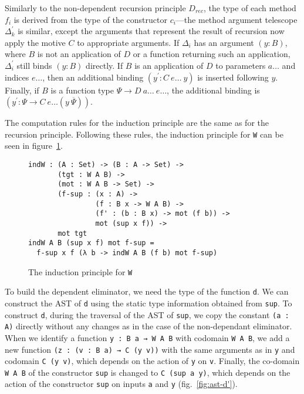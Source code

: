 \documentclass[sigplan,10pt]{acmart}
\begin{document}
Similarly to the non-dependent recursion principle $D_{\mathit{rec}}$, the type of each method $f_i$ is derived from the type of the constructor $c_i$---the method argument telescope $\Delta_k^\prime$ is similar, except the arguments that represent the result of recursion now apply the motive $C$ to appropriate arguments.
If $\Delta_i$ has an argument $(y : B)$, where $B$ is not an application of $D$ or a function returning such an application, $\Delta_i^\prime$ still binds $(y : B)$ directly.
If $B$ is an application of $D$ to parameters $a\ldots$ and indices $e\ldots$, then an additional binding $(y^\prime : C\ e\ldots\ y)$ is inserted following $y$.
Finally, if $B$ is a function type $\Psi \to D\ a\ldots\ e\ldots$, the additional binding is $(y^\prime : \Psi \to C\ e\ldots (y\ \overline{\Psi}))$. 

The computation rules for the induction principle are the same as for the recursion principle.
Following these rules, the induction principle for \texttt{W} can be seen in figure~\ref{fig:w-ind}.

\begin{figure}
\begin{Verbatim}
indW : (A : Set) -> (B : A -> Set) ->
       (tgt : W A B) ->
       (mot : W A B -> Set) ->
       (f-sup : (x : A) ->
                (f : B x -> W A B) ->
                (f' : (b : B x) -> mot (f b)) ->
                mot (sup x f)) ->
       mot tgt
indW A B (sup x f) mot f-sup =
  f-sup x f (λ b -> indW A B (f b) mot f-sup)
\end{Verbatim}
  \caption{The induction principle for \texttt{W}}
  \label{fig:w-ind}
\end{figure}

To build the dependent eliminator, we need the type of the function {\tt d}. We can construct the AST of {\tt d} using the static type information obtained from {\tt sup}. To construct {\tt d}, during the traversal of the AST of {\tt sup}, we copy the constant {\tt (a : A)} directly without any changes as in the case of the non-dependant eliminator. When we identify a function {\tt y : B a → W A B} with codomain {\tt W A B}, we add a new function {\tt (z : (v : B a) → C (y v))} with the same arguments as in {\tt y} and codomain {\tt C (y v)}, which depends on the action of {\tt y} on {\tt v}. Finally, the co-domain \texttt{W A B} of the constructor {\tt sup} is changed to {\tt C (sup a y)}, which depends on the action of the constructor {\tt sup} on inputs {\tt a} and {\tt y} (fig.~\ref{fig:ast-d'}).
\end{document}
